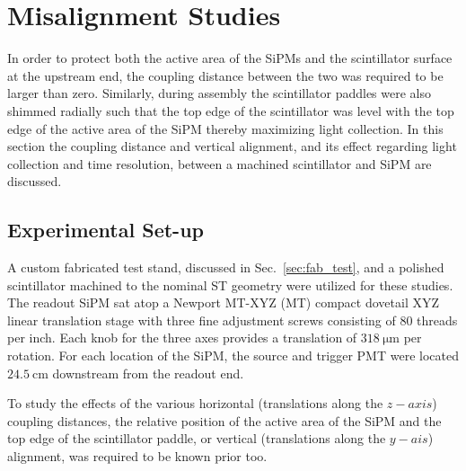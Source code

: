 \section{Misalignment Studies} \label{sec:misalign}

In order to protect both the active area of the SiPMs and the scintillator surface at the upstream end, the coupling distance between the two was required to be larger than zero.  Similarly, during assembly the scintillator paddles were also shimmed radially such that the top edge of the scintillator was level with the top edge of the active area of the SiPM thereby maximizing light collection.  In this section the coupling distance and vertical alignment, and its effect regarding light collection and time resolution, between a machined scintillator and SiPM are discussed.   

\subsection{Experimental Set-up} \label{sec:misalign_setup}

A custom fabricated test stand, discussed in Sec.~\ref{sec:fab_test}, and a polished scintillator machined to the nominal ST geometry were utilized for these studies.  The readout SiPM sat atop a Newport MT-XYZ (MT) compact dovetail XYZ linear translation stage\cite{newport_mt_xyz} with three fine adjustment screws consisting of 80 threads per inch.  Each knob for the three axes provides a translation of $318\ \mathrm{\mu m}$ per rotation.  For each location of the SiPM, the source and trigger PMT were located $\mathrm{24.5~cm}$ downstream from the readout end.

To study the effects of the various horizontal (translations along the $z-axis$) coupling distances, the relative position of the active area of the SiPM and the top edge of the scintillator paddle, or vertical (translations along the $y-ais$) alignment, was required to be known prior too.

